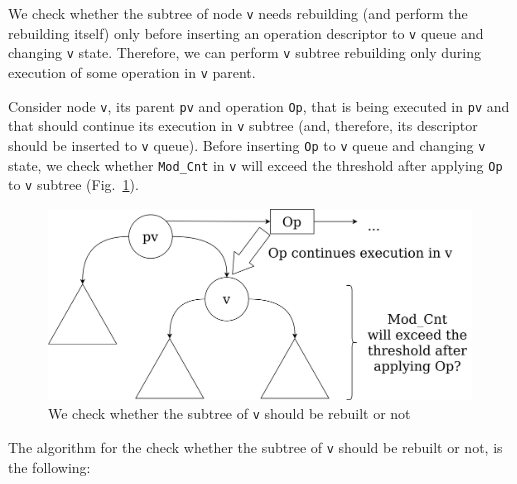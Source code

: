 \documentclass[times, dvipsnames,%
               languages={russian,english} %
              ]{itmo-student-thesis}
\begin{document}
We check whether the subtree of node \texttt{v} needs rebuilding (and perform the rebuilding itself) only before inserting an operation descriptor to \texttt{v} queue and changing \texttt{v} state. Therefore, we can perform \texttt{v} subtree rebuilding only during execution of some operation in \texttt{v} parent. 

Consider node \texttt{v}, its parent \texttt{pv} and operation \texttt{Op}, that is being executed in \texttt{pv} and that should continue its execution in \texttt{v} subtree (and, therefore, its descriptor should be inserted to \texttt{v} queue). Before inserting \texttt{Op} to \texttt{v} queue and changing \texttt{v} state, we check whether \texttt{Mod\_Cnt} in \texttt{v} will exceed the threshold after applying \texttt{Op} to \texttt{v} subtree (Fig.~\ref{rebuild-when-pic}). 

\begin{figure}[H]
  \centering
  \caption{We check whether the subtree of \texttt{v} should be rebuilt or not}
  \label{rebuild-when-pic}
  \includegraphics[width=\linewidth]{pics/rebuild-when.png}
\end{figure}

The algorithm for the check whether the subtree of \texttt{v} should be rebuilt or not, is the following:
\end{document}

